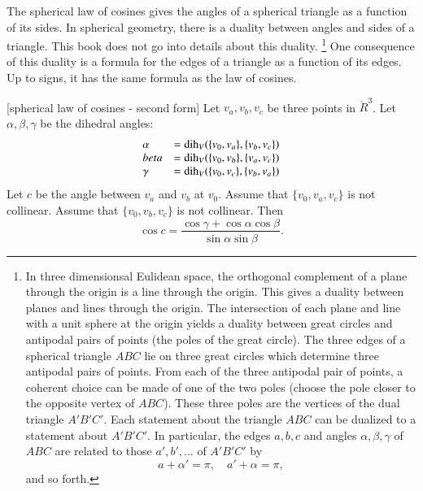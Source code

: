 The spherical law of cosines gives the angles of a spherical
triangle as a function of its sides.  In spherical geometry,
there is a duality between angles and sides of a triangle.
This book does not go into details about this duality.%
\footnote{In three dimensionsal Eulidean space, the orthogonal
complement of a plane through the origin is a line through
the origin.  This gives a duality between planes and lines
through the origin.  The intersection of each plane and line with
a unit sphere at the origin yields a duality between great
circles and antipodal
pairs of points (the poles of the great circle).  The three edges
of a spherical triangle $ABC$ lie on three great circles which
determine three
antipodal pairs of points.  From each of the three antipodal pair of points, 
a coherent
choice can be made of one of the two poles (choose the pole
closer to the opposite vertex of $ABC$).  
These three poles are the vertices
of the dual triangle $A'B'C'$.  Each statement about the triangle $ABC$
can be dualized to a statement about $A'B'C'$.
In particular, the edges $a,b,c$ and angles $\alpha,\beta,\gamma$ of $ABC$ 
are related to those $a',b',\ldots$ of $A'B'C'$ by
   $$
   a + \alpha' = \pi,\quad a' + \alpha= \pi,
   $$
and so forth.}  
One
consequence of this duality is a formula for the edges of
a triangle as a function of its edges.  Up to signs,
it has the same formula as the law of cosines.

\begin{lemma}[spherical law of cosines - second form]
Let $v_a,v_b,v_c$ be three points in $\ring{R}^3$.
Let $\alpha,\beta,\gamma$ be the dihedral angles: 
   $$
   \begin{array}{lll}
     \alpha &= \operatorname{dih}_V(\{v_0,v_a\},\{v_b,v_c\})\\
     beta &= \operatorname{dih}_V(\{v_0,v_b\},\{v_a,v_c\})\\
     \gamma&= \operatorname{dih}_V(\{v_0,v_c\},\{v_b,v_a\})\\
     \end{array}
   $$
Let $c$ be the
angle between $v_a$ and $v_b$ at $v_0$. 
Assume that $\{v_0,v_a,v_c\}$ is not
collinear. Assume that $\{v_0,v_b,v_c\}$ is not collinear.
Then
    $$
    \cos c = \frac{\cos \gamma + \cos \alpha \cos \beta}
     {\sin \alpha\sin \beta}.
    $$
\end{lemma}

